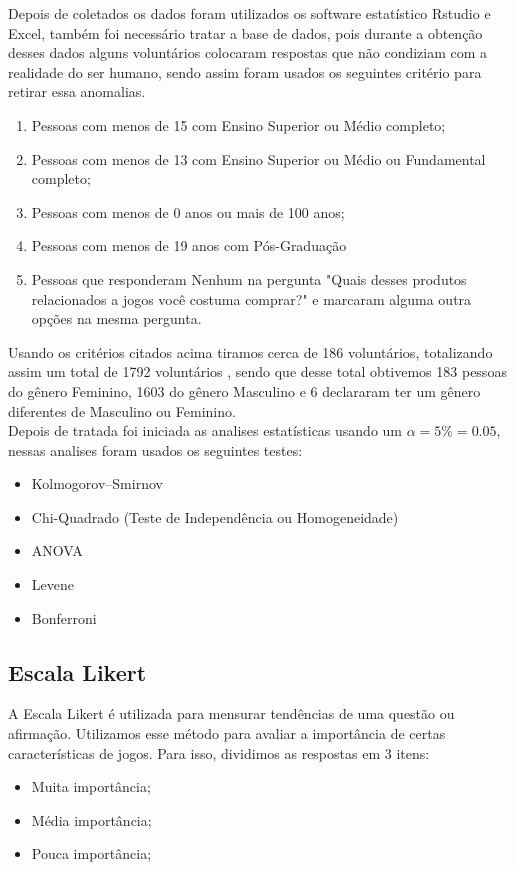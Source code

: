 \documentclass[11pt,a4paper]{article}
\begin{document}
Depois de coletados os dados foram utilizados os software estatístico Rstudio e Excel, também foi necessário tratar a base de dados, pois durante a obtenção desses dados alguns voluntários colocaram respostas que não condiziam com a realidade do ser humano, sendo assim foram usados os seguintes critério para retirar essa anomalias.
 \begin{enumerate}[label=(\roman*)]
\item Pessoas com menos de 15 com Ensino Superior ou Médio completo; 
\item Pessoas com menos de 13 com  Ensino Superior ou Médio  ou Fundamental completo;
\item Pessoas com menos de 0 anos ou mais de 100 anos;
\item Pessoas com menos de 19 anos com Pós-Graduação
\item Pessoas que responderam Nenhum na pergunta "Quais desses produtos relacionados a jogos você costuma comprar?"  e marcaram alguma outra opções na mesma pergunta.
\end{enumerate}
Usando os critérios citados acima tiramos cerca de 186 voluntários, totalizando assim um total de 1792 voluntários , sendo que desse total obtivemos 183 pessoas do gênero Feminino, 1603 do gênero Masculino e 6 declararam ter um gênero diferentes de Masculino  ou Feminino. 
\\

Depois de tratada foi iniciada as analises estatísticas usando um $\alpha=5\%=0.05$, nessas analises foram usados os seguintes testes:
\begin{itemize}[noitemsep,nolistsep]
\item Kolmogorov–Smirnov
\item Chi-Quadrado (Teste de Independência ou Homogeneidade)
\item ANOVA
\item Levene
\item Bonferroni
\end{itemize}

\subsection{Escala Likert}

A Escala Likert é utilizada para mensurar tendências de uma questão ou afirmação. Utilizamos esse método para avaliar a importância de certas características de jogos. Para isso, dividimos as respostas em 3 itens:

\begin{itemize}[noitemsep,nolistsep]
\item Muita importância; 
\item Média importância;
\item Pouca importância;
\end{itemize}
 
\end{document}
